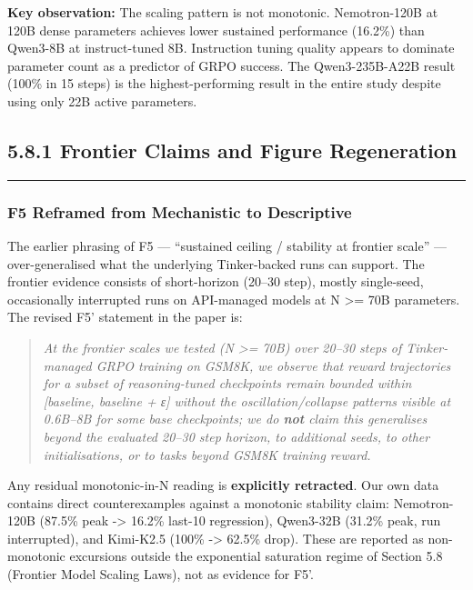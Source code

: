 \documentclass[
  american,
  11pt,
  a4paper,
  oneside]{report}
\begin{document}
\textbf{Key observation:} The scaling pattern is not monotonic.
Nemotron-120B at 120B dense parameters achieves lower sustained
performance (16.2\%) than Qwen3-8B at instruct-tuned 8B. Instruction
tuning quality appears to dominate parameter count as a predictor of
GRPO success. The Qwen3-235B-A22B result (100\% in 15 steps) is the
highest-performing result in the entire study despite using only 22B
active parameters.

\subsection{5.8.1 Frontier Claims and Figure
Regeneration}\label{frontier-claims-and-figure-regeneration}

\begin{center}\rule{0.5\linewidth}{0.5pt}\end{center}

\subsubsection{F5 Reframed from Mechanistic to
Descriptive}\label{f5-reframed-from-mechanistic-to-descriptive}

The earlier phrasing of F5 --- ``sustained ceiling / stability at
frontier scale'' --- over-generalised what the underlying Tinker-backed
runs can support. The frontier evidence consists of short-horizon
(20--30 step), mostly single-seed, occasionally interrupted runs on
API-managed models at N \textgreater= 70B parameters. The revised F5'
statement in the paper is:

\begin{quote}
\emph{At the frontier scales we tested (N \textgreater= 70B) over 20--30
steps of Tinker-managed GRPO training on GSM8K, we observe that reward
trajectories for a subset of reasoning-tuned checkpoints remain bounded
within {[}baseline, baseline + ε{]} without the oscillation/collapse
patterns visible at 0.6B--8B for some base checkpoints; we do
\textbf{not} claim this generalises beyond the evaluated 20--30 step
horizon, to additional seeds, to other initialisations, or to tasks
beyond GSM8K training reward.}
\end{quote}

Any residual monotonic-in-N reading is \textbf{explicitly retracted}.
Our own data contains direct counterexamples against a monotonic
stability claim: Nemotron-120B (87.5\% peak -\textgreater{} 16.2\%
last-10 regression), Qwen3-32B (31.2\% peak, run interrupted), and
Kimi-K2.5 (100\% -\textgreater{} 62.5\% drop). These are reported as
non-monotonic excursions outside the exponential saturation regime of
Section 5.8 (Frontier Model Scaling Laws), not as evidence for F5'.
\end{document}
